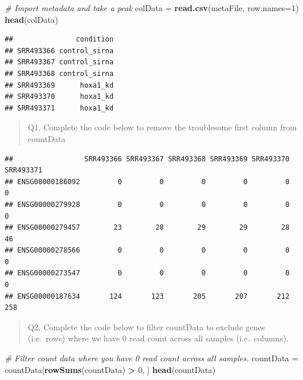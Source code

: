 \documentclass[
]{article}
\newenvironment{Shaded}{\begin{snugshade}}{\end{snugshade}}
\newcommand{\AttributeTok}[1]{\textcolor[rgb]{0.13,0.29,0.53}{#1}}
\newcommand{\CommentTok}[1]{\textcolor[rgb]{0.56,0.35,0.01}{\textit{#1}}}
\newcommand{\DecValTok}[1]{\textcolor[rgb]{0.00,0.00,0.81}{#1}}
\newcommand{\FunctionTok}[1]{\textcolor[rgb]{0.13,0.29,0.53}{\textbf{#1}}}
\newcommand{\NormalTok}[1]{#1}
\newcommand{\OtherTok}[1]{\textcolor[rgb]{0.56,0.35,0.01}{#1}}
\newcommand{\SpecialCharTok}[1]{\textcolor[rgb]{0.81,0.36,0.00}{\textbf{#1}}}
\begin{document}
\begin{Shaded}
\begin{Highlighting}[]
\CommentTok{\# Import metadata and take a peak}
\NormalTok{colData }\OtherTok{=} \FunctionTok{read.csv}\NormalTok{(metaFile, }\AttributeTok{row.names=}\DecValTok{1}\NormalTok{)}
\FunctionTok{head}\NormalTok{(colData)}
\end{Highlighting}
\end{Shaded}

\begin{verbatim}
##               condition
## SRR493366 control_sirna
## SRR493367 control_sirna
## SRR493368 control_sirna
## SRR493369      hoxa1_kd
## SRR493370      hoxa1_kd
## SRR493371      hoxa1_kd
\end{verbatim}

\begin{quote}
Q1. Complete the code below to remove the troublesome first column from
countData
\end{quote}

\begin{Shaded}
\end{Shaded}

\begin{verbatim}
##                 SRR493366 SRR493367 SRR493368 SRR493369 SRR493370 SRR493371
## ENSG00000186092         0         0         0         0         0         0
## ENSG00000279928         0         0         0         0         0         0
## ENSG00000279457        23        28        29        29        28        46
## ENSG00000278566         0         0         0         0         0         0
## ENSG00000273547         0         0         0         0         0         0
## ENSG00000187634       124       123       205       207       212       258
\end{verbatim}

\begin{quote}
Q2. Complete the code below to filter countData to exclude genes
(i.e.~rows) where we have 0 read count across all samples
(i.e.~columns).
\end{quote}

\begin{Shaded}
\begin{Highlighting}[]
\CommentTok{\# Filter count data where you have 0 read count across all samples.}
\NormalTok{countData }\OtherTok{=}\NormalTok{ countData[}\FunctionTok{rowSums}\NormalTok{(countData) }\SpecialCharTok{\textgreater{}} \DecValTok{0}\NormalTok{, ]}
\FunctionTok{head}\NormalTok{(countData)}
\end{Highlighting}
\end{Shaded}
\end{document}
